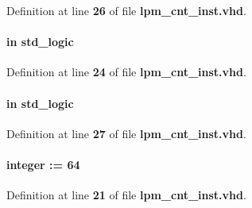 Definition at line {\bf 26} of file {\bf lpm\+\_\+cnt\+\_\+inst.\+vhd}.

\paragraph[{clk}]{ {\bfseries \textcolor{keywordflow}{in}\textcolor{vhdlchar}{ }} {\bfseries \textcolor{comment}{std\+\_\+logic}\textcolor{vhdlchar}{ }} \hspace{0.3cm}{\ttfamily [Port]}}\label{classlpm__cnt__inst_a4a4609c199d30b3adebbeb3a01276ec5}


Definition at line {\bf 24} of file {\bf lpm\+\_\+cnt\+\_\+inst.\+vhd}.

\paragraph[{cnt\+\_\+en}]{ {\bfseries \textcolor{keywordflow}{in}\textcolor{vhdlchar}{ }} {\bfseries \textcolor{comment}{std\+\_\+logic}\textcolor{vhdlchar}{ }} \hspace{0.3cm}{\ttfamily [Port]}}\label{classlpm__cnt__inst_ae38744f3a642f6ace049aa96c2398489}


Definition at line {\bf 27} of file {\bf lpm\+\_\+cnt\+\_\+inst.\+vhd}.

\paragraph[{cnt\+\_\+width}]{ {\bfseries \textcolor{vhdlchar}{ }} {\bfseries \textcolor{comment}{integer}\textcolor{vhdlchar}{ }\textcolor{vhdlchar}{ }\textcolor{vhdlchar}{\+:}\textcolor{vhdlchar}{=}\textcolor{vhdlchar}{ }\textcolor{vhdlchar}{ } \textcolor{vhdldigit}{64} \textcolor{vhdlchar}{ }} \hspace{0.3cm}{\ttfamily [Generic]}}\label{classlpm__cnt__inst_a4328269cc798a8d2125c42471e783690}


Definition at line {\bf 21} of file {\bf lpm\+\_\+cnt\+\_\+inst.\+vhd}.


